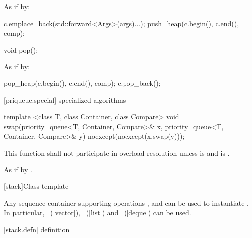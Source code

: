 \begin{itemdescr}
\pnum
\effects
As if by:
\begin{codeblock}
c.emplace_back(std::forward<Args>(args)...);
push_heap(c.begin(), c.end(), comp);
\end{codeblock}
\end{itemdescr}


%
\begin{itemdecl}
void pop();
\end{itemdecl}

\begin{itemdescr}
\pnum
\effects
As if by:
\begin{codeblock}
pop_heap(c.begin(), c.end(), comp);
c.pop_back();
\end{codeblock}
\end{itemdescr}

[priqueue.special]{ specialized algorithms}

%
%
\begin{itemdecl}
template <class T, class Container, class Compare>
  void swap(priority_queue<T, Container, Compare>& x,
            priority_queue<T, Container, Compare>& y) noexcept(noexcept(x.swap(y)));
\end{itemdecl}

\begin{itemdescr}
\pnum
\remarks
This function shall not participate in overload resolution
unless  is  and
 is .

\pnum
\effects As if by .
\end{itemdescr}

[stack]{Class template }

\pnum
{}%
Any sequence container supporting operations
,
and
can be used to instantiate
.
In particular,
~(\ref{vector}),
~(\ref{list})
and
~(\ref{deque})
can be used.

[stack.defn]{ definition}


